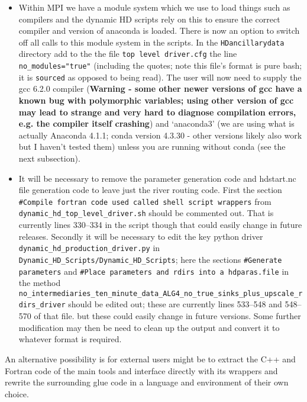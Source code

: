 \documentclass{article}
\begin{document}
\begin{itemize}
\item Within MPI we have a module system which we use to load things such as compilers and the dynamic HD scripts rely on this to ensure the correct compiler and version of anaconda is loaded. There is now an option to switch off all calls to this module system in the scripts. In the \lstinline[style=bash_input]{HDancillarydata} directory add to the the file  \lstinline[style=bash_input]{top level driver.cfg} the line \lstinline[style=bash_input]{no_modules="true"}  (including the quotes; note this file's format is pure bash; it is \lstinline[style=bash_input]{sourced} as opposed to being read). The user will now need to supply the gcc 6.2.0 compiler (\textbf{Warning - some other newer versions of gcc have a known bug with polymorphic variables; using other version of gcc may lead to strange  and very hard to diagnose compilation errors, e.g. the compiler itself crashing}) and `anaconda3' (we are using what is actually Anaconda 4.1.1; conda version 4.3.30 - other versions likely also work but I haven't tested them) unless you are running without conda (see the next subsection).
\item It will be necessary to remove the parameter generation code and hdstart.nc file generation code to leave just the river routing code. First the section \\  \lstinline[style=bash_input]{#Compile fortran code used called shell script wrappers} from \lstinline[style=bash_input]{dynamic_hd_top_level_driver.sh} should be commented out. That is currently lines 330--334 in the script though that could easily change in future releases. Secondly it will be necessary to edit the key python driver \lstinline[style=bash_input]{dynamic_hd_production_driver.py} in \lstinline[style=bash_input]{Dynamic_HD_Scripts/Dynamic_HD_Scripts}; here the sections \lstinline[style=bash_input]{#Generate parameters} and \lstinline[style=bash_input]{#Place parameters and rdirs into a hdparas.file} in the method \lstinline[style=bash_input]{no_intermediaries_ten_minute_data_ALG4_no_true_sinks_plus_upscale_rdirs_driver} should be edited out; these are currently lines 533--548 and 548--570 of that file. but these could easily change in future versions. Some further modification may then be need to clean up the output and convert it to whatever format is required.
\end{itemize}
An alternative possibility is for external users might be to extract the C++ and Fortran code of the main tools and interface directly with its wrappers and rewrite the surrounding glue code in a language and environment of their own choice.
\end{document}

